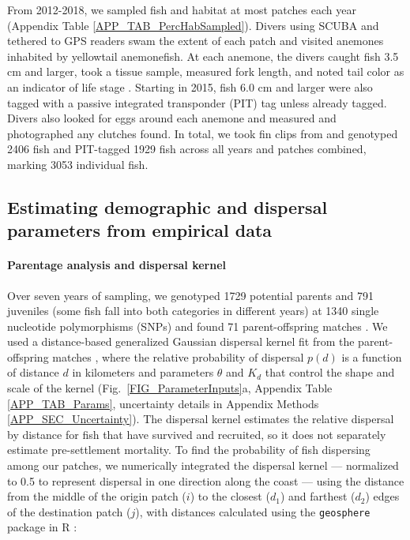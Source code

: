 \documentclass[12pt, oneside]{article}   	%
\begin{document}
From 2012-2018, we sampled fish and habitat at most patches each year (Appendix Table \ref{APP_TAB_PercHabSampled}). Divers using SCUBA and tethered to GPS readers swam the extent of each patch and visited anemones inhabited by yellowtail anemonefish. At each anemone, the divers caught fish 3.5 cm and larger, took a tissue sample, measured fork length, and noted tail color as an indicator of life stage \citep{moyer1976geographical}. Starting in 2015, fish 6.0 cm and larger were also tagged with a passive integrated transponder (PIT) tag unless already tagged. Divers also looked for eggs around each anemone and measured and photographed any clutches found. In total, we took fin clips from and genotyped 2406 fish and PIT-tagged 1929 fish across all years and patches combined, marking 3053 individual fish. %

\subsection*{Estimating demographic and dispersal parameters from empirical data} 

\paragraph*{Parentage analysis and dispersal kernel}  %

Over seven years of sampling, we genotyped 1729 potential parents and 791 juveniles (some fish fall into both categories in different years) at 1340 single nucleotide polymorphisms (SNPs) and found 71 parent-offspring matches \citep{catalanoInPrepconnectivity}. We used a distance-based generalized Gaussian dispersal kernel fit from the parent-offspring matches \citep{catalanoInPrepconnectivity, bode2018estimating}, where the relative probability of dispersal $p(d)$ is a function of distance $d$ in kilometers and parameters $\theta$ and $K_d$ that control the shape and scale of the kernel (Fig.\ \ref{FIG_ParameterInputs}a, Appendix Table \ref{APP_TAB_Params}, uncertainty details in Appendix Methods \ref{APP_SEC_Uncertainty}). The dispersal kernel estimates the relative dispersal by distance for fish that have survived and recruited, so it does not separately estimate pre-settlement mortality. To find the probability of fish dispersing among our patches, we numerically integrated the dispersal kernel --- normalized to 0.5 to represent dispersal in one direction along the coast --- using the distance from the middle of the origin patch ($i$) to the closest ($d_1$) and farthest ($d_2$) edges of the destination patch ($j$), with distances calculated using the \texttt{geosphere} package in R \citep{geosphere2017R}:
\end{document}
